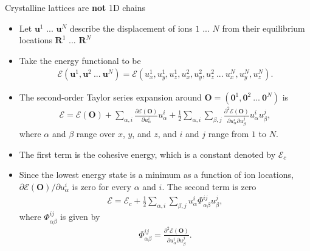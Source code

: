 \documentclass{beamer}
\newcommand*\vf[1]{\mathbf{#1}}
\begin{document}
\begin{frame}{Crystalline lattices are \textbf{not} 1D chains}
\begin{itemize}
\item Let $\vf{u}^1$ ... $\vf{u}^N$ describe the displacement of ions $1$ ... $N$ from their equilibrium locations $\vf{R}^1$ ... $\vf{R}^N$
\item Take the energy functional to be
\begin{align*}
\mathcal{E}(\vf{u}^1, \vf{u}^2~...~\vf{u}^N) = \mathcal{E}(u_x^1, u_y^1, u_z^1, u_x^2, u_y^2, u_z^2~...~u_x^N, u_y^N, u_z^N).
\end{align*}
\item The second-order Taylor series expansion around $\vf{O} = (\vf{0}^1, \vf{0}^2~...~\vf{0}^N)$ is
\begin{align*}
\mathcal{E} = \mathcal{E}(\vf{O}) + \sum_{\alpha,i} \frac{\partial \mathcal{E}(\vf{O})}{\partial u_\alpha^i}u_\alpha^i + \frac{1}{2} \sum_{\alpha,i} \sum_{\beta,j} \frac{\partial^2 \mathcal{E}(\vf{O})}{\partial u_\alpha^i \partial u_\beta^j} u_\alpha^i u_\beta^j,
\end{align*}
where $\alpha$ and $\beta$ range over $x$, $y$, and $z$, and $i$ and $j$ range from $1$ to $N$.
\end{itemize}
\end{frame}

\begin{frame}{}
\begin{itemize}
\item The first term is the cohesive energy, which is a constant denoted by $\mathcal{E}_c$
\item Since the lowest energy state is a minimum as a function of ion locations, $\partial \mathcal{E}(\vf{O}) / \partial u_\alpha^i$ is zero for every $\alpha$ and $i$. The second term is zero
\begin{align}
\mathcal{E} = \mathcal{E}_c + \frac{1}{2} \sum_{\alpha,i} \sum_{\beta,j} u_\alpha^i \Phi_{\alpha \beta}^{i j} u_\beta^{j}, \label{eq:3d_energy}
\end{align}
where $\Phi_{\alpha \beta}^{i j}$ is given by
\begin{align}
\Phi_{\alpha \beta}^{i j} = \frac{\partial^2 \mathcal{E}(\vf{O})}{\partial u_\alpha^i \partial u_\beta^j}.
\end{align}
\end{itemize}
\end{frame}
\end{document}
